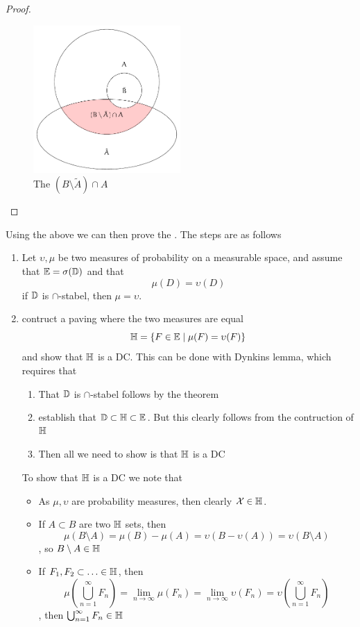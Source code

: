 \begin{proof}
\begin{figure}[htbp]
  \centering
  \includegraphics[width=0.5\textwidth]{fig/intersec.pdf}
  \caption{The \((B\setminus\tilde{A})\cap A\) }
  \label{fig:label}
\end{figure}
\end{proof}
Using the above we can then prove the . The steps are as follows
\begin{enumerate}
  \item Let \(\upsilon,\mu\) be two measures of probability on a measurable space, and assume that \({\mathbb{E}}=\sigma({\mathbb{D}})\) and that
  \[
    \mu(D)=\upsilon(D)
  \]
if \({\mathbb{D}}\) is \(\cap\)-stabel, then \(\mu=\upsilon\).
  \item contruct a paving where the two measures are equal
  \[
    {\mathbb{H}}=\{F\in{\mathbb{E}}\mid \mu(F)=\upsilon(F)\}
  \]
  and show that \({\mathbb{H}}\) is a DC. This can be done with Dynkins lemma, which requires that
  \begin{enumerate}
    \item That \({\mathbb{D}}\) is \(\cap\)-stabel follows by the theorem
    \item establish that \({\mathbb{D}}\subset{\mathbb{H}}\subset{\mathbb{E}}\). But this clearly follows from the contruction of \({\mathbb{H}}\)
    \item Then all we need to show is that \({\mathbb{H}}\) is a DC
  \end{enumerate}
  To show that \({\mathbb{H}}\) is a DC we note that
  \begin{itemize}
    \item As \(\mu,\upsilon\) are probability measures, then clearly \({\mathcal{X}}\in{\mathbb{H}}\).
    \item If \(A\subset B\) are two \({\mathbb{H}}\) sets, then
    \[
      \mu(B\setminus A)=\mu(B)-\mu(A)=\upsilon(B-\upsilon(A))=\upsilon(B\setminus A)
    \],
    so \(B\setminus A\in{\mathbb{H}}\)
    \item If \(F_1, F_2 \subset \ldots\in{\mathbb{H}}\), then
    \[
      \mu\left(\bigcup_{n=1}^\infty F_n\right)=\lim_{n \rightarrow\infty} \mu(F_n)=\lim_{n \rightarrow\infty}\upsilon(F_n)=\upsilon\left(\bigcup_{n=1}^\infty F_n\right)
    \],
    then \(\bigcup_{n=1}^\infty F_n\in{\mathbb{H}}\)


  \end{itemize}

\end{enumerate}
